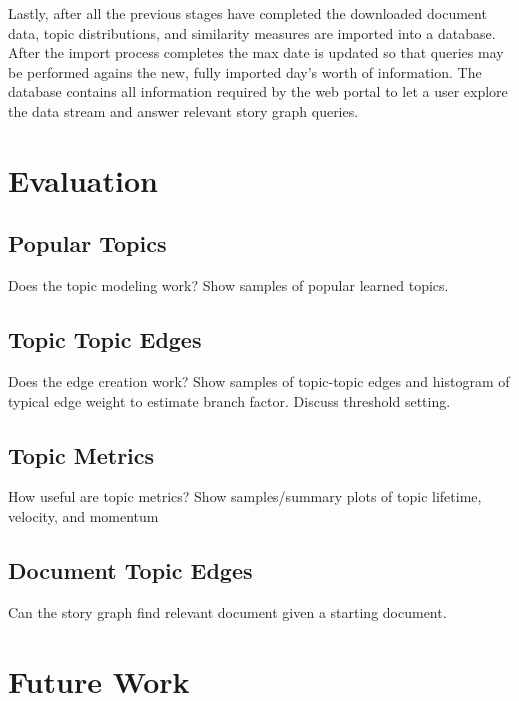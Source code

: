 \documentclass[10pt,twocolumn]{article}
\begin{document}
Lastly, after all the previous stages have completed the downloaded document data, topic distributions, and similarity measures are imported into a database.  After the import process completes the max date is updated so that queries may be performed agains the new, fully imported day's worth of information.  The database contains all information required by the web portal to let a user explore the data stream and answer relevant story graph queries.

\section {Evaluation}

\subsection {Popular Topics}
Does the topic modeling work? Show samples of popular learned topics.

\subsection {Topic Topic Edges}
Does the edge creation work?  Show samples of topic-topic edges and histogram of typical edge weight to estimate branch factor.  Discuss threshold setting.

\subsection {Topic Metrics}
How useful are topic metrics? Show samples/summary plots of topic lifetime, velocity, and momentum

\subsection {Document Topic Edges}
Can the story graph find relevant document given a starting document.

\section {Future Work}
\end{document}
